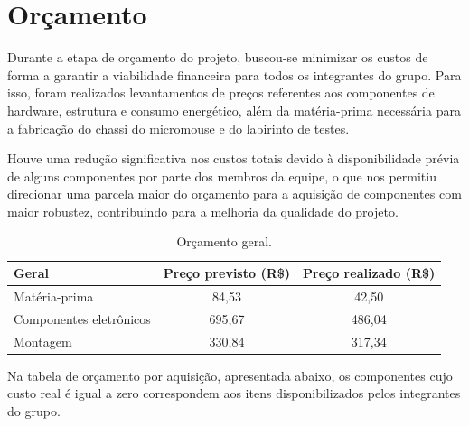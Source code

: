 \chapter{Orçamento}

Durante a etapa de orçamento do projeto, buscou-se minimizar os custos de forma a garantir a viabilidade financeira para todos os integrantes do grupo. Para isso, foram realizados levantamentos de preços referentes aos componentes de hardware, estrutura e consumo energético, além da matéria-prima necessária para a fabricação do chassi do micromouse e do labirinto de testes.

Houve uma redução significativa nos custos totais devido à disponibilidade prévia de alguns componentes por parte dos membros da equipe, o que nos permitiu direcionar uma parcela maior do orçamento para a aquisição de componentes com maior robustez, contribuindo para a melhoria da qualidade do projeto.

\vspace{0.5cm}

\begin{table}[htpb]
\centering
\caption{Orçamento geral.}
\begin{tabular}{|l|c|c|}
\hline
\textbf{Geral}          & \textbf{Preço previsto (R\$)} & \textbf{Preço realizado (R\$)} \\ \hline
Matéria-prima           & 84,53                         & 42,50                          \\ \hline
Componentes eletrônicos & 695,67                        & 486,04                         \\ \hline
Montagem                & 330,84                         & 317,34                          \\ \hline
\end{tabular}
\end{table}

\vspace{0.5cm}

Na tabela de orçamento por aquisição, apresentada abaixo, os componentes cujo custo real é igual a zero correspondem aos itens disponibilizados pelos integrantes do grupo.

\vspace{0.5cm}

